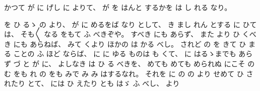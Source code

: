 
%
かつて
が
に
げし
に
よりて、
%
が
を
はんと
するかを
は
し
れる
なり。

%
を
ひ
るゝ%
の
より、
%
が
に
めるをば
なり
として、
%
き
まし
れん
とする
に
ひては、
%
そも〳〵
なる
をもて
ふ
べきぞや。
%
すべき
にも
あらず、
%
また
より
ひ
くべき
にも
あらねば、
%
みて%
くより
ほかの
は
かる
べし。
%
されど
の
を
きて
ひ
まる
ことの
ふ
%
ほど
ならば、
%
に
に
ゆる
ものは
も
くて、
%
に
はるゝまでも%
あらず
づ
と
が
に、
%
よしなき
は
ひ
る
べきを、
%
めても
めても
められぬ
にこそ
の
む%
をも
れ
の
をも
みで
み
み
はするなれ。
%
それを
に
の
の
より
せめて
ひ
されたり
とて、
%
には
ひ
えたり
とも
はゞ%
ふ
べし、
%
より%
